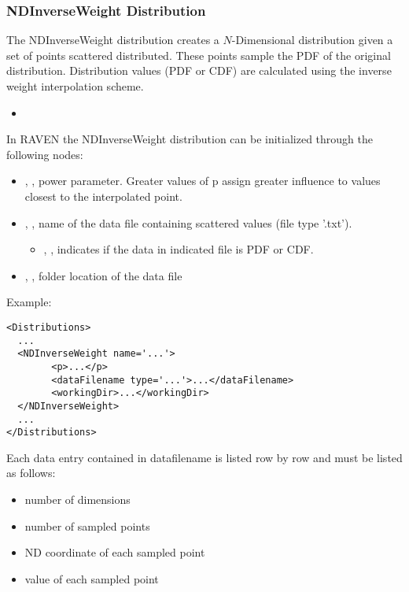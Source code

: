 \subsubsection{NDInverseWeight Distribution}
\label{NDInverseWeight}
The NDInverseWeight distribution creates a $N$-Dimensional distribution given a set of points
scattered distributed. These points sample the PDF of the original distribution.
Distribution values (PDF or CDF) are calculated using the inverse weight
interpolation scheme.

%
\attrsIntro
\vspace{-5mm}
\begin{itemize}
\itemsep0em
\item \nameDescription
\end{itemize}
\vspace{-5mm}


In RAVEN the NDInverseWeight distribution can be initialized through the following nodes:
\begin{itemize}
\item {}, , power parameter. Greater values of p assign greater influence to values closest to the interpolated point.
\item {}, ,  name of the data file containing scattered values (file type '.txt').
\begin{itemize}
\item {}, ,  indicates if the data in indicated file is PDF or CDF.
\end{itemize}
\item {}, , folder location of the data file
\end{itemize}

Example:
\begin{lstlisting}[style=XML]
<Distributions>
  ...
  <NDInverseWeight name='...'>
        <p>...</p>
        <dataFilename type='...'>...</dataFilename>
        <workingDir>...</workingDir>
  </NDInverseWeight>
  ...
</Distributions>
\end{lstlisting}

Each data entry contained in data\textunderscore filename is listed row by row and must be listed as follows:
\begin{itemize}
\item number of dimensions
\item number of sampled points
\item ND coordinate of each sampled point
\item value of each sampled point
\end{itemize}

